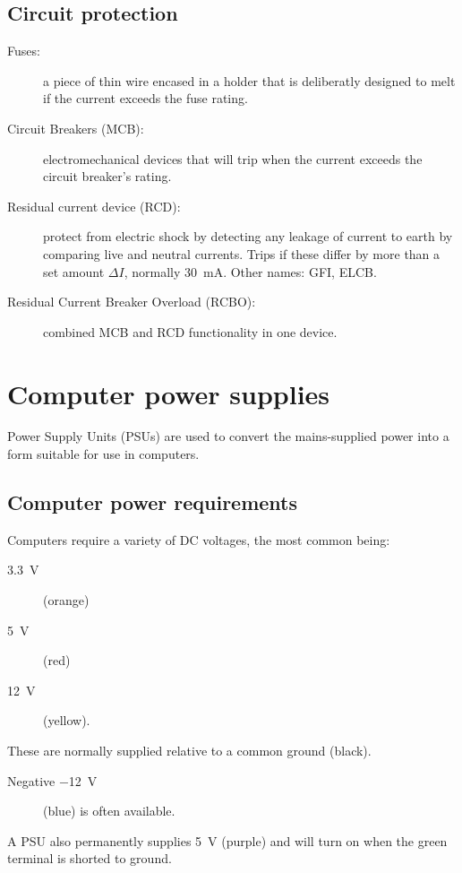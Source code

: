 \subsection{Circuit protection}

\begin{description}
\item[Fuses:] a piece of thin wire encased in a holder that is deliberatly designed to melt if the current exceeds the fuse rating.
\item[Circuit Breakers (MCB):] electromechanical devices that will trip when the current exceeds the circuit breaker's rating.
\item[Residual current device (RCD):] protect from electric shock by detecting any leakage of current to earth by comparing live and neutral currents.
  Trips if these differ by more than a set amount $\Delta I$, normally \SI{30}{\milli\ampere}.
  Other names: GFI, ELCB.
\item[Residual Current Breaker Overload (RCBO):] combined MCB and RCD functionality in one device.
\end{description}

\section{Computer power supplies}

Power Supply Units (PSUs) are used to convert the mains-supplied power into a form suitable for use in computers.

\subsection{Computer power requirements}

Computers require a variety of DC voltages, the most common being:
\begin{description}
\item[\SI{3.3}{\volt}] (orange)
\item[\SI{5}{\volt}] (red)
\item[\SI{12}{\volt}] (yellow).
\end{description}
These are normally supplied relative to a common ground (black).
\begin{description}
\item[Negative \SI{-12}{\volt}] (blue) is often available.
\end{description}
A PSU also permanently supplies \SI{5}{\volt} (purple) and will turn on when the green terminal is shorted to ground.

